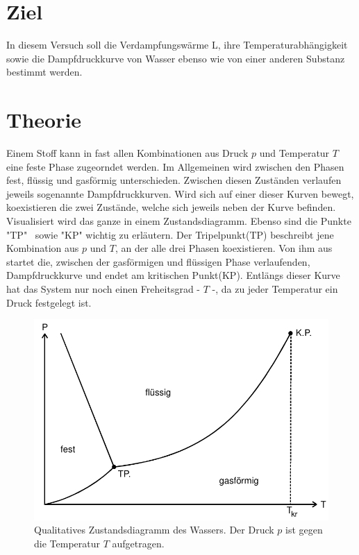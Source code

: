 \section{Ziel}
In diesem Versuch soll die Verdampfungswärme L, ihre Temperaturabhängigkeit sowie die Dampfdruckkurve
von Wasser ebenso wie von einer anderen Substanz bestimmt werden.
\section{Theorie}
\label{sec:Theorie}
\cite{sample}
Einem Stoff kann in fast allen Kombinationen aus Druck $p$ und Temperatur $T$ eine feste Phase zugeorndet werden.
Im Allgemeinen wird zwischen den Phasen fest, flüssig und gasförmig unterschieden. Zwischen diesen Zuständen verlaufen jeweils
sogenannte Dampfdruckkurven. Wird sich auf einer dieser Kurven bewegt, koexistieren die zwei Zustände, welche sich jeweils neben der Kurve befinden.
Visualisiert  wird das ganze in einem Zustandsdiagramm. Ebenso sind die Punkte "TP" \, sowie "KP" wichtig zu erläutern. Der Tripelpunkt(TP) beschreibt jene Kombination
aus $p$ und $T$, an der alle drei Phasen koexistieren. Von ihm aus startet die, zwischen der gasförmigen und flüssigen Phase verlaufenden, Dampfdruckkurve und
endet am kritischen Punkt(KP). Entlängs dieser Kurve hat das System nur noch einen Freheitsgrad - $T$ -, da zu jeder Temperatur ein Druck festgelegt ist.
\begin{figure}[h]
    \centering
    \includegraphics[scale=0.8]{"screen.jpg"}
    \caption{Qualitatives Zustandsdiagramm des Wassers. Der Druck $p$ ist gegen die Temperatur $T$ aufgetragen.}
    \label{Abb1:Zustandsdiagramm}
\end{figure}
